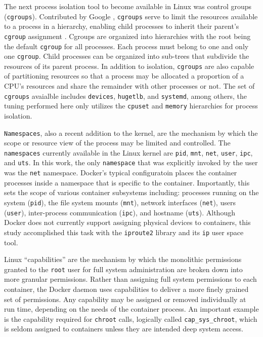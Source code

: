 The next process isolation tool to become available in Linux was control groups (\texttt{cgroups}).  
Contributed by Google \autocite{googlecgroups}, \texttt{cgroups} serve to limit the resources available to a process in a hierarchy, enabling child processes to inherit their parent's \texttt{cgroup} assignment \autocite{kernelcgroups}. 
Cgroups are organized into hierarchies with the root being the default \texttt{cgroup} for all processes. 
Each process must belong to one and only one \texttt{cgroup}. 
Child processes can be organized into sub-trees that subdivide the resources of its parent process.  
In addition to isolation, \texttt{cgroups} are also capable of partitioning resources so that a process may be allocated a proportion of a CPU's resources and share the remainder with other processes or not.
The set of \texttt{cgroups} avaialble includes \texttt{devices}, \texttt{hugetlb}, and \texttt{systemd}, among others, the tuning performed here only utilizes the \texttt{cpuset} and \texttt{memory} hierarchies for process isolation.

\texttt{Namespaces}, also a recent addition to the kernel, are the mechanism by which the scope or resource view of the process may be limited and controlled.
The \texttt{namespaces} currently available in the Linux kernel are \texttt{pid}, \texttt{mnt}, \texttt{net}, \texttt{user}, \texttt{ipc}, and \texttt{uts}.
In this work, the only \texttt{namespace} that was explicitly invoked by the user was the \texttt{net} namespace.  
Docker's typical configuratoin places the container processes inside a namespace that is specific to the container. 
Importantly, this sets the scope of various container subsystems including: processes running on the system (\texttt{pid}), the file system mounts (\texttt{mnt}), network interfaces (\texttt{net}), users (\texttt{user}), inter-process communication (\texttt{ipc}), and hostname (\texttt{uts}).
Although Docker does not currently support assigning physical devices to containers, this study accomplished this task with the \texttt{iproute2} library and its \texttt{ip} user space tool.  

Linux ``capabilities'' are the mechanism by which the monolithic permissions granted to the \texttt{root} user for full system administration are broken down into more granular permissions.  
Rather than assigning full system permissions to each container, the Docker daemon uses capabilities to deliver a more finely grained set of permissions.
Any capability may be assigned or removed individually at run time, depending on the needs of the container process.
An important example is the capability required for \texttt{chroot} calls, logically called \texttt{cap\_sys\_chroot}, which is seldom assigned to containers unless they are intended deep system access.

